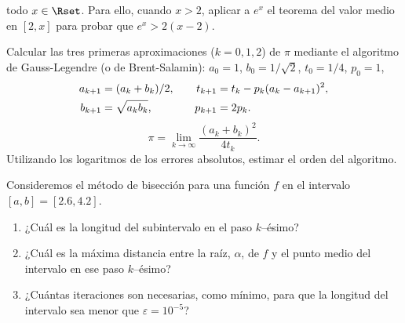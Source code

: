 \documentclass[11pt]{article}
\begin{document}
\begin{problemas}
\begin{problema}
\begin{itemize}
      todo $x\in\Rset$. Para ello, cuando $x>2$, aplicar a $e^x$ el
      teorema del valor medio en $[2,x]$ para probar que $e^x>2(x-2)$.
    \end{itemize}
  \end{problema}
  \begin{problema}
    Calcular las tres primeras aproximaciones ($k=0,1,2$) de $\pi$
    mediante el algoritmo de Gauss-Legendre (o de Brent-Salamin):
    $a_0=1$, $b_0=1/\sqrt 2$, $t_0=1/4$, $p_0=1$,
    \begin{align*}
      a_{k+1}&=(a_{k}+b_{k})/2 , &\quad
      t_{k+1}&=t_k - p_k(a_k -a_{k+1})^2, \\
      b_{k+1}& =\sqrt{a_{k}\*b_{k}}, &\quad p_{k+1}&=2p_k.
    \end{align*}
    $$
    \pi = \lim_{k\to\infty} \frac{(a_k+b_k)^2}{4t_k}.
    $$
    Utilizando los logaritmos de los errores absolutos, estimar el
    orden del algoritmo.
  \end{problema}
  \begin{problema}
    Consideremos el método de bisección para
    una función $f$ en el intervalo $[a,b]=[2.6,4.2]$. 
    \begin{enumerate}
    \item ¿Cuál es la longitud del subintervalo en el paso $k$--ésimo?
    \item ¿Cuál es la máxima distancia entre la raíz, $\alpha$, de $f$
      y el punto medio del intervalo en ese paso $k$--ésimo?
    \item ¿Cuántas iteraciones son necesarias, como mínimo, para que
      la longitud del intervalo sea menor que $\varepsilon=10^{-5}$?
    \end{enumerate}
  \end{problema}
 
\end{problemas}
\end{document}
